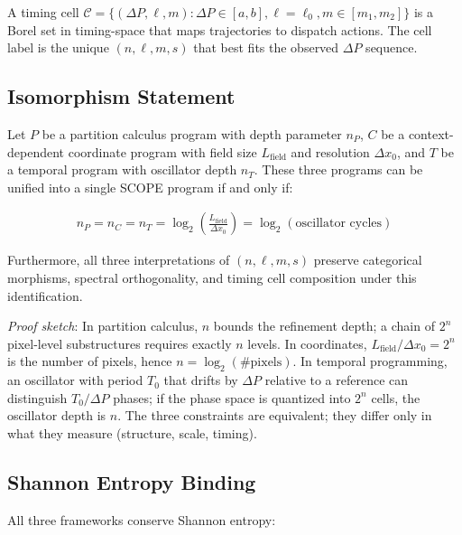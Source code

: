 \documentclass[11pt,twocolumn]{article}
\begin{document}
A timing cell $\mathcal{C} = \{(\Delta P, \ell, m) : \Delta P \in [a, b], \ell = \ell_0, m \in [m_1, m_2]\}$ is a Borel set in timing-space that maps trajectories to dispatch actions. The cell label is the unique $(n, \ell, m, s)$ that best fits the observed $\Delta P$ sequence.

\subsection{Isomorphism Statement}

\begin{theorem}
\label{thm:iso}
Let $P$ be a partition calculus program with depth parameter $n_P$, $C$ be a context-dependent coordinate program with field size $L_{\text{field}}$ and resolution $\Delta x_0$, and $T$ be a temporal program with oscillator depth $n_T$. These three programs can be unified into a single SCOPE program if and only if:

\begin{align}
n_P = n_C = n_T = \log_2\left(\frac{L_{\text{field}}}{\Delta x_0}\right) = \log_2(\text{oscillator cycles})
\end{align}

Furthermore, all three interpretations of $(n, \ell, m, s)$ preserve categorical morphisms, spectral orthogonality, and timing cell composition under this identification.
\end{theorem}

\textit{Proof sketch}: In partition calculus, $n$ bounds the refinement depth; a chain of $2^n$ pixel-level substructures requires exactly $n$ levels. In coordinates, $L_{\text{field}} / \Delta x_0 = 2^n$ is the number of pixels, hence $n = \log_2(\#\text{pixels})$. In temporal programming, an oscillator with period $T_0$ that drifts by $\Delta P$ relative to a reference can distinguish $T_0 / \Delta P$ phases; if the phase space is quantized into $2^n$ cells, the oscillator depth is $n$. The three constraints are equivalent; they differ only in what they measure (structure, scale, timing).

\subsection{Shannon Entropy Binding}

All three frameworks conserve Shannon entropy:
\end{document}
